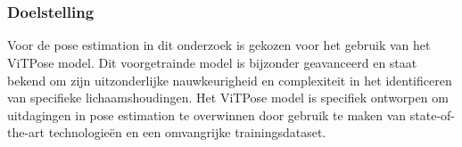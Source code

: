 \chapter{}%
\label{ch:poseestimation}

\subsection{Doelstelling}
Voor de pose estimation in dit onderzoek is gekozen voor het gebruik van het ViTPose model. Dit voorgetrainde model is bijzonder geavanceerd en staat bekend om zijn uitzonderlijke nauwkeurigheid en complexiteit in het identificeren van specifieke lichaamshoudingen. Het ViTPose model is specifiek ontworpen om uitdagingen in pose estimation te overwinnen door gebruik te maken van state-of-the-art technologieën en een omvangrijke trainingsdataset.

